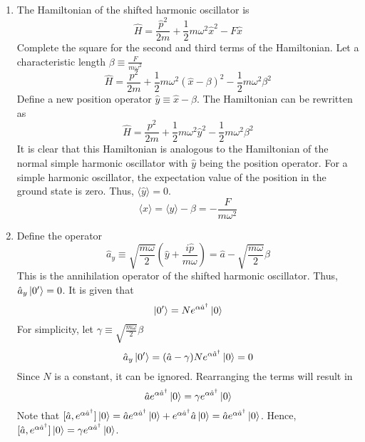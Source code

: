 \begin{sol}
\begin{enumerate}[label=\textbf{(\alph*)}]
\item
The Hamiltonian of the shifted harmonic oscillator is 
\begin{equation}
	\hat H=\frac{\hat p^2}{2m}+\frac{1}{2}m\omega^2\hat x^2-F\hat x
\end{equation}
Complete the square for the second and third terms of the Hamiltonian. Let a characteristic length $\beta\equiv\frac{F}{m\omega^2}$
\begin{equation}
	\hat H=\frac{p^2}{2m}+\frac{1}{2}m\omega^2(\hat x-\beta)^2-\frac{1}{2}m\omega^2\beta^2
\end{equation}
Define a new position operator $\hat y\equiv \hat x-\beta$. The Hamiltonian can be rewritten as
\begin{equation}
	\hat H=\frac{p^2}{2m}+\frac{1}{2}m\omega^2\hat y^2-\frac{1}{2}m\omega^2\beta^2
\end{equation}
It is clear that this Hamiltonian is analogous to the Hamiltonian of the normal simple harmonic oscillator with $\hat y$ being the position operator. For a simple harmonic oscillator, the expectation value of the position in the ground state is zero. Thus, $\langle\hat y\rangle=0$. 
\begin{equation}
	\langle x\rangle=\langle y\rangle-\beta=-\frac{F}{m\omega^2}
\end{equation}
\item
Define the operator
\begin{equation}
	\hat a_y\equiv\sqrt{\frac{m\omega}{2}}\left(\hat y+\frac{i\hat p}{m\omega}\right)=\hat a-\sqrt{\frac{m\omega}{2}}\beta
\end{equation}
This is the annihilation operator of the shifted harmonic oscillator. Thus, $\hat a_y\ket {0'}=0$.
It is given that 
\begin{equation}
	\ket{0'}=Ne^{\alpha \hat a^\dagger}\ket 0
\end{equation}
For simplicity, let $\gamma\equiv\sqrt{\frac{m\omega}{2}}\beta$ 
\begin{equation}
	\hat a_y\ket{0'}=(\hat a-\gamma)Ne^{\alpha \hat a^\dagger}\ket 0=0
\end{equation} 
Since $N$ is a constant, it can be ignored. Rearranging the terms will result in
\begin{equation}
	\hat ae^{\alpha\hat a^\dagger}\ket 0=\gamma e^{\alpha\hat a^\dagger}\ket 0
\end{equation}
Note that $[\hat a,e^{\alpha\hat a^\dagger}]\ket 0=\hat ae^{\alpha\hat a^\dagger}\ket 0+e^{\alpha\hat a^\dagger}\hat a\ket 0=\hat ae^{\alpha\hat a^\dagger}\ket 0$. Hence, $[\hat a,e^{\alpha\hat a^\dagger}]\ket 0=\gamma e^{\alpha\hat a^\dagger}\ket 0$.\\

\end{enumerate}
\end{sol}
